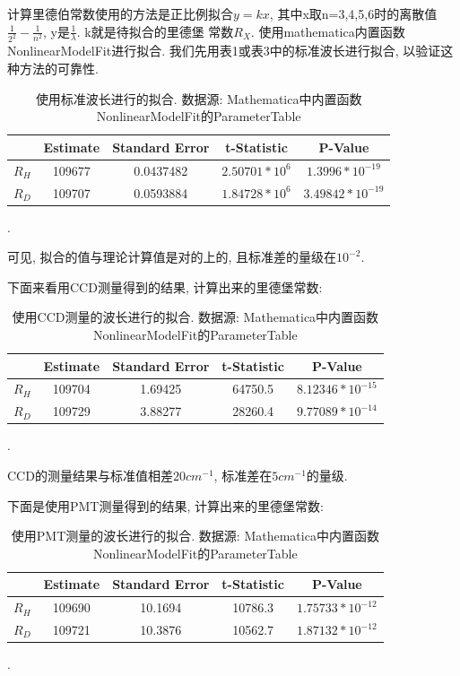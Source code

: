 \documentclass[12pt,a4paper]{article}
\begin{document}
计算里德伯常数使用的方法是正比例拟合$y=kx$, 其中x取n=3,4,5,6时的离散值$\frac{1}{2^2}-\frac{1}{n^2}$, y是$\frac{1}{\lambda}$. k就是待拟合的里德堡
常数$R_{X}$. 使用mathematica内置函数NonlinearModelFit进行拟合. 我们先用表1或表3中的标准波长进行拟合, 以验证这种方法的可靠性.

\begin{table}[H]
    \centering
    \begin{tabular}{|c|c|c|c|c|}
    \hline
       & Estimate & Standard Error & t-Statistic                   & P-Value                         \\ \hline
    $R_{H}$ & 109677   & 0.0437482      & $2.50701*10^6$ & $1.3996*10^{-19}$  \\ \hline
    $R_{D}$  & 109707   & 0.0593884      & $1.84728*10^6$ & $3.49842*10^{-19}$ \\ \hline
    \end{tabular}
    \caption{使用标准波长进行的拟合. 数据源: Mathematica中内置函数NonlinearModelFit的ParameterTable}.
    \end{table}

可见, 拟合的值与理论计算值是对的上的, 且标准差的量级在$10^{-2}$. 

下面来看用CCD测量得到的结果, 计算出来的里德堡常数: 

\begin{table}[H]
    \centering
    \begin{tabular}{|c|c|c|c|c|}
    \hline
       & Estimate & Standard Error & t-Statistic & P-Value                         \\ \hline
    $R_{H}$ & 109704   & 1.69425        & 64750.5     & $8.12346*10^{-15}$ \\ \hline
    $R_{D}$ & 109729   & 3.88277        & 28260.4     & $9.77089*10^{-14}$ \\ \hline
    \end{tabular}
    \caption{使用CCD测量的波长进行的拟合. 数据源: Mathematica中内置函数NonlinearModelFit的ParameterTable}.
    \end{table}

CCD的测量结果与标准值相差$20cm^{-1}$, 标准差在$5cm^{-1}$的量级. 

下面是使用PMT测量得到的结果, 计算出来的里德堡常数: 

\begin{table}[H]
    \centering
    \begin{tabular}{|c|c|c|c|c|}
    \hline
      & Estimate & Standard Error & t-Statistic & P-Value                         \\ \hline
      $R_{H}$ & 109690   & 10.1694        & 10786.3     & $1.75733*10^{-12}$ \\ \hline
      $R_{D}$  & 109721   & 10.3876        & 10562.7     & $1.87132*10^{-12}$ \\ \hline
    \end{tabular}
    \caption{使用PMT测量的波长进行的拟合. 数据源: Mathematica中内置函数NonlinearModelFit的ParameterTable}.
    \end{table}
\end{document}
